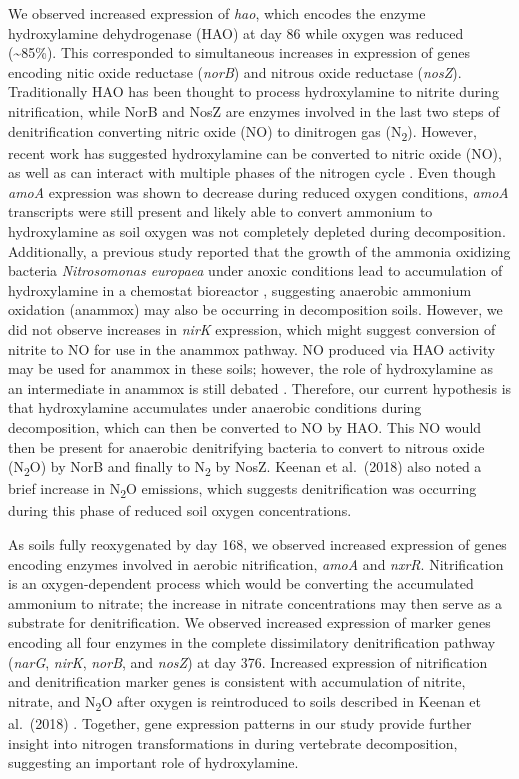 \documentclass[
  sn-nature,
  lineno, referee]{sn-jnl}
\begin{document}
We observed increased expression of \emph{hao}, which encodes the enzyme
hydroxylamine dehydrogenase (HAO) at day 86 while oxygen was reduced
(\textasciitilde85\%). This corresponded to simultaneous increases in
expression of genes encoding nitic oxide reductase (\emph{norB}) and
nitrous oxide reductase (\emph{nosZ}). Traditionally HAO has been
thought to process hydroxylamine to nitrite during nitrification, while
NorB and NosZ are enzymes involved in the last two steps of
denitrification converting nitric oxide (NO) to dinitrogen gas
(N\textsubscript{2}). However, recent work has suggested hydroxylamine
can be converted to nitric oxide (NO), as well as can interact with
multiple phases of the nitrogen cycle
\citep{soler-jofra_hydroxylamine_2021}. Even though \emph{amoA}
expression was shown to decrease during reduced oxygen conditions,
\emph{amoA} transcripts were still present and likely able to convert
ammonium to hydroxylamine as soil oxygen was not completely depleted
during decomposition. Additionally, a previous study reported that the
growth of the ammonia oxidizing bacteria \emph{Nitrosomonas europaea}
under anoxic conditions lead to accumulation of hydroxylamine in a
chemostat bioreactor \citep{yu_nitrosomonas_2018}, suggesting anaerobic
ammonium oxidation (anammox) may also be occurring in decomposition
soils. However, we did not observe increases in \emph{nirK} expression,
which might suggest conversion of nitrite to NO for use in the anammox
pathway. NO produced via HAO activity may be used for anammox in these
soils; however, the role of hydroxylamine as an intermediate in anammox
is still debated \citep{soler-jofra_hydroxylamine_2021}. Therefore, our
current hypothesis is that hydroxylamine accumulates under anaerobic
conditions during decomposition, which can then be converted to NO by
HAO. This NO would then be present for anaerobic denitrifying bacteria
to convert to nitrous oxide (N\textsubscript{2}O) by NorB and finally to
N\textsubscript{2} by NosZ. Keenan et al.~(2018)
\citep{keenan_mortality_2018} also noted a brief increase in
N\textsubscript{2}O emissions, which suggests denitrification was
occurring during this phase of reduced soil oxygen concentrations.

As soils fully reoxygenated by day 168, we observed increased expression
of genes encoding enzymes involved in aerobic nitrification, \emph{amoA}
and \emph{nxrR}. Nitrification is an oxygen-dependent process which
would be converting the accumulated ammonium to nitrate; the increase in
nitrate concentrations may then serve as a substrate for
denitrification. We observed increased expression of marker genes
encoding all four enzymes in the complete dissimilatory denitrification
pathway (\emph{narG}, \emph{nirK}, \emph{norB}, and \emph{nosZ}) at day
376. Increased expression of nitrification and denitrification marker
genes is consistent with accumulation of nitrite, nitrate, and
N\textsubscript{2}O after oxygen is reintroduced to soils described in
Keenan et al.~(2018)
\citep{keenan_mortality_2018, debruyn_carrion_2024}. Together, gene
expression patterns in our study provide further insight into nitrogen
transformations in during vertebrate decomposition, suggesting an
important role of hydroxylamine.
\end{document}
